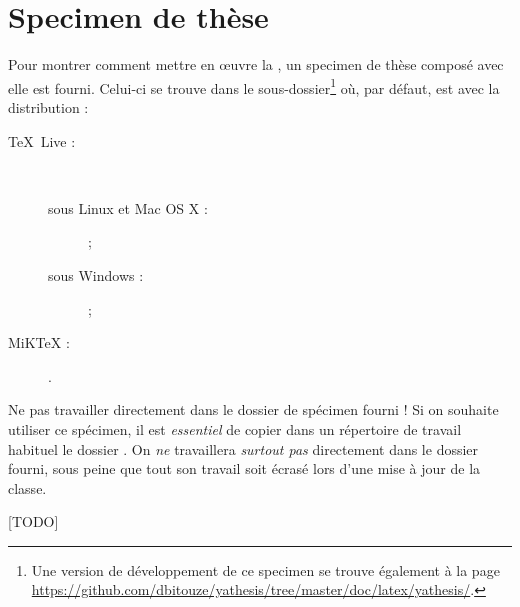\chapter{Specimen de thèse}\label{cha:specimen}

Pour montrer comment mettre en œuvre la \yatcl, un specimen de thèse composé
avec elle est fourni.  Celui-ci se trouve dans le sous-dossier\footnote{Une
  version de développement de ce specimen se trouve également à la page
  \url{https://github.com/dbitouze/yathesis/tree/master/doc/latex/yathesis/}.}
 où, par défaut, 
est avec la distribution :
\begin{description}
\item[\TeX{}~Live :]\
  \begin{description}
  \item[sous Linux et Mac OS X :] \unixtldirectory\tldistdirectory\versiontl ;
  \item[sous Windows :] \wintldirectory\tldistdirectory\versiontl ;
  \end{description}
\item[MiK\TeX{} :] \miktexdistdirectory.
\end{description}

\begin{dbwarning}{Ne pas travailler directement dans le dossier de spécimen
    fourni !}{}
  Si on souhaite utiliser ce spécimen, il est \emph{essentiel} de copier dans
  un répertoire de travail habituel le dossier \directory{sample}. On \emph{ne}
  travaillera \emph{surtout pas} directement dans le dossier fourni, sous peine
  que tout son travail soit écrasé lors d'une mise à jour de la classe.
\end{dbwarning}


[TODO]

%
\iffalse
\fi
